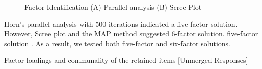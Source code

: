 \documentclass[
  english,
  man]{apa6}
\begin{document}
\begin{appendix}
\begin{figure}
\caption{Factor Identification (A) Parallel analysis (B) Scree Plot}\label{fig:facIdFigAppB}
\end{figure}

Horn's parallel analysis with 500 iterations indicated a five-factor
solution. However, Scree plot and the MAP method suggested 6-factor
solution. five-factor solution . As a result, we tested both five-factor
and six-factor solutions.

\begin{table}[h]

\begin{center}
\begin{threeparttable}

\caption{\label{tab:EFATableAppB}Factor loadings and communality of the retained items [Unmerged Responses]}

\small{

}
\end{threeparttable}
\end{center}
\end{table}
\end{appendix}
\end{document}
